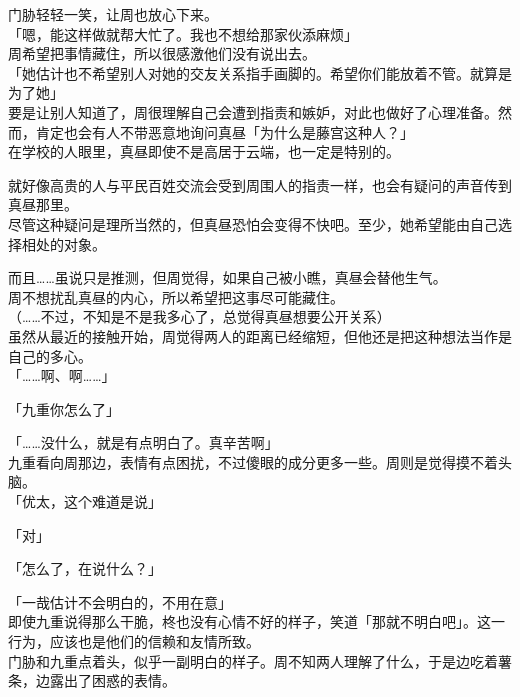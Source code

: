 门胁轻轻一笑，让周也放心下来。\\

「嗯，能这样做就帮大忙了。我也不想给那家伙添麻烦」\\

周希望把事情藏住，所以很感激他们没有说出去。\\

「她估计也不希望别人对她的交友关系指手画脚的。希望你们能放着不管。就算是为了她」\\

要是让别人知道了，周很理解自己会遭到指责和嫉妒，对此也做好了心理准备。然而，肯定也会有人不带恶意地询问真昼「为什么是藤宫这种人？」\\

在学校的人眼里，真昼即使不是高居于云端，也一定是特别的。

就好像高贵的人与平民百姓交流会受到周围人的指责一样，也会有疑问的声音传到真昼那里。\\

尽管这种疑问是理所当然的，但真昼恐怕会变得不快吧。至少，她希望能由自己选择相处的对象。

而且……虽说只是推测，但周觉得，如果自己被小瞧，真昼会替他生气。\\

周不想扰乱真昼的内心，所以希望把这事尽可能藏住。\\

（……不过，不知是不是我多心了，总觉得真昼想要公开关系）\\

虽然从最近的接触开始，周觉得两人的距离已经缩短，但他还是把这种想法当作是自己的多心。\\

「……啊、啊……」

「九重你怎么了」

「……没什么，就是有点明白了。真辛苦啊」\\

九重看向周那边，表情有点困扰，不过傻眼的成分更多一些。周则是觉得摸不着头脑。\\

「优太，这个难道是说」

「对」

「怎么了，在说什么？」

「一哉估计不会明白的，不用在意」\\

即使九重说得那么干脆，柊也没有心情不好的样子，笑道「那就不明白吧」。这一行为，应该也是他们的信赖和友情所致。\\

门胁和九重点着头，似乎一副明白的样子。周不知两人理解了什么，于是边吃着薯条，边露出了困惑的表情。
